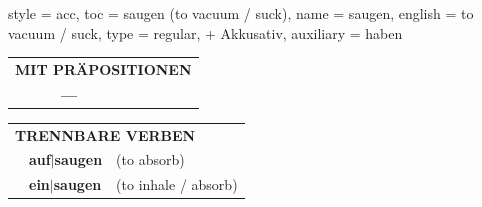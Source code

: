 \begin{verbentry}{
  style = {acc},
  toc = {saugen (to vacuum / suck)},
  name = {saugen},
  english = {to vacuum / suck},
  type = {regular, + Akkusativ},
  auxiliary = {haben}
}
\vspace{10pt}

\begin{tabular}{lll}
\multicolumn{3}{l}{\textbf{MIT PRÄPOSITIONEN}}\\
& \textbf{---} & \\
\end{tabular}
\hfill
\begin{tabular}{lll}
\multicolumn{3}{l}{\textbf{TRENNBARE VERBEN}}\\
& \textbf{auf$|$saugen} & (to absorb)\\
& \textbf{ein$|$saugen} & (to inhale / absorb)\\
\end{tabular}

\vspace{-5pt}
\end{verbentry}

